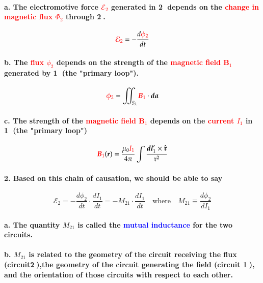 \documentclass{article}
\begin{document}
\paragraph{\indent a. The electromotive force \textcolor{red}{$\mathcal{E}_2$} generated in \textcircled{2} depends on the \textcolor{red}{change in magnetic flux $\Phi_2$} through \textcircled{2}.}
\begin{equation*}
    \textcolor{red}{\mathcal{E}_2}=-\frac{d\textcolor{red}{\phi_2}}{dt}
\end{equation*}
\paragraph{\indent b. The \textcolor{red}{flux $\phi_2$} depends on the strength of the \textcolor{red}{magnetic field $\boldsymbol{B}_1$} generated by \textcircled{1} (the "primary loop").}
\begin{equation*}
    \textcolor{red}{\phi_2}=\iint_{S_2}\textcolor{red}{\boldsymbol{B}_1}\cdot\boldsymbol{da}
\end{equation*}
\paragraph{\indent c. The strength of the \textcolor{red}{magnetic field $\boldsymbol{B}_1$} depends on the \textcolor{red}{current $I_1$} in \textcircled{1} (the "primary loop")}
\begin{equation*}
    \textcolor{red}{\boldsymbol{B}_1}(\boldsymbol{r})=\frac{\mu_0\textcolor{red}{I_1}}{4\pi}\int\frac{\boldsymbol{dl}_1'\times\hat{\boldsymbol{\mathfrak{r}}}}{\mathfrak{r}^2}
\end{equation*}
\paragraph{2. Based on this chain of causation, we should be able to say}
\begin{equation*}
    \mathcal{E}_2=-\frac{d\phi_2}{dt}\cdot\frac{dI_1}{dt}=-M_{21}\cdot\frac{dI_1}{dt}\quad\text{where}\quad M_{21}\equiv\frac{d\phi_2}{dI_1}  
\end{equation*}
\paragraph{\indent a. The quantity $M_{21}$ is called the \textcolor{blue}{mutual inductance} for the two circuits.}
\paragraph{\indent b. $M_{21}$ is related to the geometry of the circuit receiving the flux (circuit\textcircled{2}),the geometry of the circuit generating the field (circuit \textcircled{1}), and the orientation of those circuits with respect to each other.}
\end{document}
